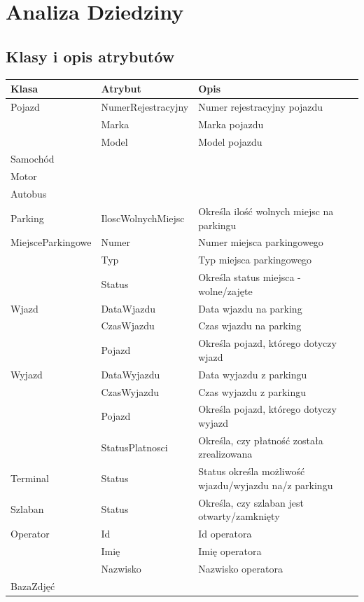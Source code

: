 \chapter{Analiza Dziedziny}
\label{cha:anDziedziny}

\section{Klasy i opis atrybutów}
\label{sec:klasyAtrybuty}
\begin{table}[H]
	\begin{tabular}{|l|l|l|} \hline
	\textbf{Klasa}	& \textbf{Atrybut} & \textbf{Opis} \\ \hline%
	Pojazd	& NumerRejestracyjny & Numer rejestracyjny pojazdu \\
	& Marka & Marka pojazdu \\
	& Model & Model pojazdu \\
	Samochód& & \\
	Motor& &  \\
	Autobus& & \\
	Parking	& IloscWolnychMiejsc & Określa ilość wolnych miejsc na parkingu \\
	MiejsceParkingowe	& Numer & Numer miejsca parkingowego \\
	& Typ & Typ miejsca parkingowego \\
	& Status & Określa status miejsca - wolne/zajęte \\
	Wjazd	& DataWjazdu & Data wjazdu na parking\\
	& CzasWjazdu & Czas wjazdu na parking \\
	& Pojazd & Określa pojazd, którego dotyczy wjazd \\
	Wyjazd	& DataWyjazdu & Data wyjazdu z parkingu\\
	& CzasWyjazdu & Czas wyjazdu z parkingu \\
	& Pojazd & Określa pojazd, którego dotyczy wyjazd \\
	& StatusPlatnosci & Określa, czy płatność została zrealizowana \\
	Terminal & Status & Status określa możliwość wjazdu/wyjazdu na/z parkingu \\
	Szlaban & Status & Określa, czy szlaban jest otwarty/zamknięty\\
	Operator& Id & Id operatora \\
	& Imię & Imię operatora \\
	& Nazwisko & Nazwisko operatora \\
	BazaZdjęć& &  \\ \hline
	\end{tabular}
\end{table}


